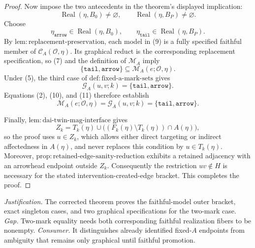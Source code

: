 \documentclass{article}
\begin{document}
\begin{proof}
Now impose the two antecedents in the theorem's displayed implication:
\[
 \operatorname{Real}(\eta,B_0)\ne\varnothing,
 \qquad
 \operatorname{Real}(\eta,B_P)\ne\varnothing.
 \tag{8}
\]
Choose
\[
 \eta_{\mathtt{arrow}}\in\operatorname{Real}(\eta,B_0),
 \qquad
 \eta_{\mathtt{tail}}\in\operatorname{Real}(\eta,B_P).
 \tag{9}
\]
By \(\mathrm{lem:replacement\mbox{-}preservation}\), each model in (9) is a fully specified faithful member of \(\mathcal C_A(\mathcal O,\eta)\).  Its graphical reduct is the corresponding replacement specification, so (7) and the definition of \(\mathcal M_A\) imply
\[
 \{\mathtt{tail},\mathtt{arrow}\}
 \subseteq\mathcal M_A(e;\mathcal O,\eta).
 \tag{10}
\]
Under (5), the third case of \(\mathrm{def:fixed\mbox{-}a\mbox{-}mark\mbox{-}sets}\) gives
\[
 \mathcal G_A(u,v;k)=\{\mathtt{tail},\mathtt{arrow}\}.
 \tag{11}
\]
Equations (2), (10), and (11) therefore establish
\[
 \mathcal M_A(e;\mathcal O,\eta)
 =\mathcal G_A(u,v;k)
 =\{\mathtt{tail},\mathtt{arrow}\}.
\]

Finally, \(\mathrm{lem:dai\mbox{-}twin\mbox{-}mag\mbox{-}interface}\) gives
\[
 Z_k=T_k(\eta)\cup
 \bigl((F_k(\eta)\setminus T_k(\eta))\cap A(\eta)\bigr),
\]
so the proof uses \(u\in Z_k\), which allows either direct targeting or indirect affectedness in \(A(\eta)\), and never replaces this condition by \(u\in T_k(\eta)\).  Moreover, \(\mathrm{prop:retained\mbox{-}edge\mbox{-}sanity\mbox{-}reduction}\) exhibits a retained adjacency with an arrowhead endpoint outside \(Z_k\).  Consequently the restriction \(uv\notin H\) is necessary for the stated intervention-created-edge bracket.  This completes the proof.
\end{proof}
\par\smallskip\noindent \textit{Justification.} The corrected theorem proves the faithful-model outer bracket, exact singleton cases, and two graphical specifications for the two-mark case. \textit{Gap.} Two-mark equality needs both corresponding faithful realization fibers to be nonempty. \textit{Consumer.} It distinguishes already identified fixed-\(A\) endpoints from ambiguity that remains only graphical until faithful promotion.
\end{document}

